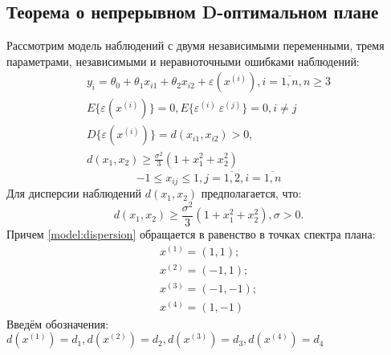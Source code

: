 \subsection{Теорема о непрерывном D-оптимальном плане}
Рассмотрим модель наблюдений с двумя независимыми переменными, тремя параметрами, независимыми и неравноточными ошибками наблюдений:
\begin{gather} \label{model:start}
y_i = \theta_0 + \theta_1 x_{i1} + \theta_2 x_{i2} + \varepsilon(x^{(i)}), i = \overline{1, n}, n \ge 3 \\
E\{ \varepsilon(x^{(i)}) \} = 0, E\{ \varepsilon^{(i)}\ \varepsilon^{(j)} \} = 0, i \ne j \\
D\{ \varepsilon(x^{(i)}) \} = d(x_{i1}, x_{i2}) > 0, \\
d(x_1, x_2) \ge \frac{\sigma^2}{3}(1 + x_1^2 + x_2^2) \label{model:end}
\end{gather}
$$ -1 \le x_{ij} \le 1, j = \overline{1, 2}, i = \overline{1, n}$$
Для дисперсии наблюдений $d(x_1, x_2)$ предполагается, что:
\begin{equation}\label{model:dispersion}
d(x_1, x_2) \ge \frac{\sigma^2}{3}(1 + x_1^2 + x_2^2), \sigma > 0.
\end{equation}
Причем \eqref{model:dispersion} обращается в равенство в точках спектра плана:
\begin{equation}\label{plan-points}
\begin{gathered}
x^{(1)}=(1, 1); \\
x^{(2)}=(-1, 1); \\
x^{(3)}=(-1, -1); \\
x^{(4)}=(1, -1)
\end{gathered}
\end{equation}
Введём обозначения: $d(x^{(1)}) = d_1, d(x^{(2)}) = d_2, d(x^{(3)}) = d_3, d(x^{(4)}) = d_4$

